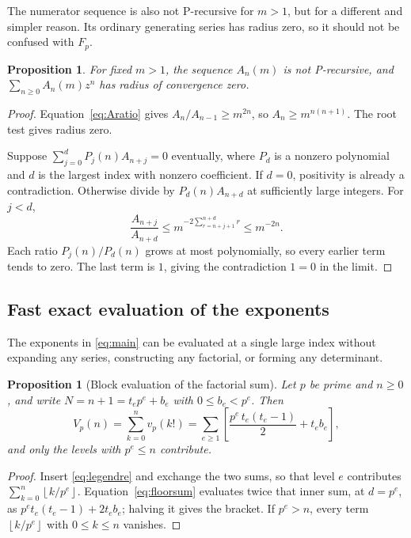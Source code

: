 \documentclass[11pt,a4paper]{article}
\numberwithin{equation}{section}
\newtheorem{proposition}[theorem]{Proposition}
\theoremstyle{definition}
\theoremstyle{remark}
\newcommand{\floor}[1]{\left\lfloor#1\right\rfloor}
\begin{document}
The numerator sequence is also not P-recursive for $m>1$, but for a different and simpler reason. Its ordinary generating series has radius zero, so it should not be confused with $F_p$.

\begin{proposition}\label{prop:Anonrec}
For fixed $m>1$, the sequence $A_n(m)$ is not P-recursive, and $\sum_{n\geq0}A_n(m)z^n$ has radius of convergence zero.
\end{proposition}
\begin{proof}
Equation~\eqref{eq:Aratio} gives $A_n/A_{n-1}\geq m^{2n}$, so $A_n\geq m^{n(n+1)}$. The root test gives radius zero.

Suppose $\sum_{j=0}^dP_j(n)A_{n+j}=0$ eventually, where $P_d$ is a nonzero polynomial and $d$ is the largest index with nonzero coefficient. If $d=0$, positivity is already a contradiction. Otherwise divide by $P_d(n)A_{n+d}$ at sufficiently large integers. For $j<d$,
\[
 \frac{A_{n+j}}{A_{n+d}}
 \leq m^{-2\sum_{r=n+j+1}^{n+d}r}
 \leq m^{-2n}.
\]
Each ratio $P_j(n)/P_d(n)$ grows at most polynomially, so every earlier term tends to zero. The last term is $1$, giving the contradiction $1=0$ in the limit.
\end{proof}

\subsection{Fast exact evaluation of the exponents}\label{sec:fasteval}
The exponents in \eqref{eq:main} can be evaluated at a single large index without expanding any series, constructing any factorial, or forming any determinant.

\begin{proposition}[Block evaluation of the factorial sum]\label{prop:fasteval}
Let $p$ be prime and $n\geq0$, and write $N=n+1=t_ep^e+b_e$ with $0\leq b_e<p^e$. Then
\begin{equation}\label{eq:fasteval}
 V_p(n)=\sum_{k=0}^n v_p(k!)
 =\sum_{e\geq1}\left[\frac{p^e\,t_e(t_e-1)}2+t_eb_e\right],
\end{equation}
and only the levels with $p^e\leq n$ contribute.
\end{proposition}
\begin{proof}
Insert \eqref{eq:legendre} and exchange the two sums, so that level $e$ contributes $\sum_{k=0}^n\floor{k/p^e}$. Equation~\eqref{eq:floorsum} evaluates twice that inner sum, at $d=p^e$, as $p^et_e(t_e-1)+2t_eb_e$; halving it gives the bracket. If $p^e>n$, every term $\floor{k/p^e}$ with $0\leq k\leq n$ vanishes.
\end{proof}
\end{document}
